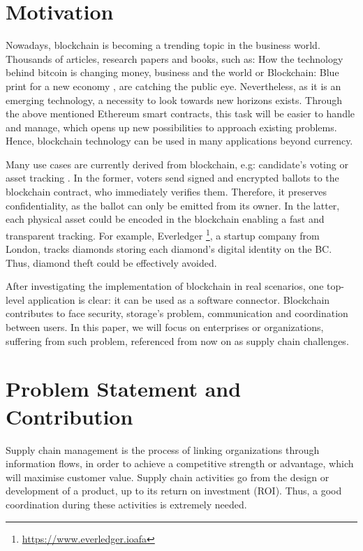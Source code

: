 \section{Motivation}

Nowadays, blockchain is becoming a trending topic in the business world. Thousands of articles, research papers and books, such as: How the technology behind bitcoin is changing money, business and the world \cite{tapscott2016blockchain} or Blockchain: Blue print for a new economy \cite{swan2015blockchain}, are catching the public eye. Nevertheless, as it is an emerging technology, a necessity to look towards new horizons exists. Through the above mentioned Ethereum smart contracts, this task will be easier to handle and manage, which opens up new possibilities to approach existing problems. Hence, blockchain technology can be used in many applications beyond currency.

Many use cases are currently derived from blockchain, e.g: candidate's voting or asset tracking \cite{abeyratne2016blockchain}. In the former, voters send signed and encrypted ballots to the blockchain contract, who immediately verifies them. Therefore, it preserves confidentiality, as the ballot can only be emitted from its owner. In the latter, each physical asset could be encoded in the blockchain enabling a fast and transparent tracking. For example, Everledger \footnote{\url{https://www.everledger.ioafa}}, a startup company from London, tracks diamonds storing each diamond's digital identity on the BC. Thus, diamond theft could be effectively avoided.

After investigating the implementation of blockchain in real scenarios, one top-level application is clear: it can be used as a software connector. Blockchain contributes to face security, storage's problem, communication and coordination between users. In this paper, we will focus on enterprises or organizations, suffering from such problem, referenced from now on as supply chain challenges.

\section{Problem Statement and Contribution}

Supply chain management is the process of linking organizations through information flows, in order to achieve a competitive strength or advantage, which will maximise customer value. Supply chain activities go from the design or development of a product, up to its return on investment (ROI). Thus, a good coordination during these activities is extremely needed.

